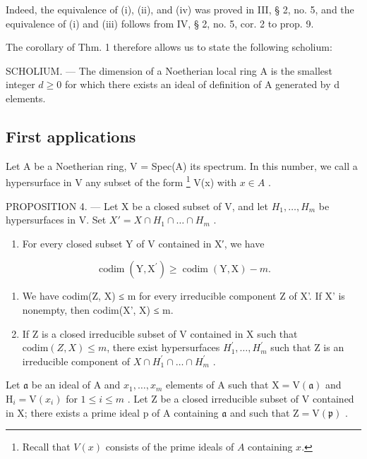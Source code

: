 Indeed, the equivalence of (i), (ii), and (iv) was proved in III, § 2, no. 5, and the equivalence of (i) and (iii) follows from IV, § 2, no. 5, cor. 2 to prop. 9.

The corollary of Thm. 1 therefore allows us to state the following scholium:

SCHOLIUM. --- The dimension of a Noetherian local ring A is the smallest integer \(d \geqslant 0\) for which there exists an ideal of definition of A generated by d elements.

\subsection{First applications}

Let A be a Noetherian ring, V = Spec(A) its spectrum. In this number, we call a hypersurface in V any subset of the form \footnote{Recall that \(V(x)\) consists of the prime ideals of \(A\) containing \(x\).} V(x) with \(x \in A\) .

PROPOSITION 4. --- Let X be a closed subset of V, and let \(H_{1}, \ldots, H_{m}\) be hypersurfaces in V. Set \(X' = X \cap H_{1} \cap \ldots \cap H_{m}\) .

\begin{enumerate}
\def\labelenumi{\alph{enumi})}
\tightlist
\item
  For every closed subset Y of V contained in X′, we have
\end{enumerate}

\[
\operatorname{codim} (\mathrm{Y}, \mathrm{X} ^ {\prime}) \geqslant \operatorname{codim} (\mathrm{Y}, \mathrm{X}) - m.
\]

\begin{enumerate}
\def\labelenumi{\alph{enumi})}
\setcounter{enumi}{1}
\item
  We have codim(Z, X) ≤ m for every irreducible component Z of X'. If X' is nonempty, then codim(X', X) ≤ m.
\item
  If Z is a closed irreducible subset of V contained in X such that \(\text{codim}(Z, X) \leqslant m\), there exist hypersurfaces \(H_{1}^{\prime}, \ldots, H_{m}^{\prime}\) such that Z is an irreducible component of \(X \cap H_{1}^{\prime} \cap \ldots \cap H_{m}^{\prime}\) .
\end{enumerate}

Let \(\mathfrak{a}\) be an ideal of A and \(x_{1},\ldots,x_{m}\) elements of A such that \(\mathrm{X}=\mathrm{V}(\mathfrak{a})\) and \(\mathrm{H}_{i}=\mathrm{V}(x_{i})\) for \(1\leqslant i\leqslant m\) . Let Z be a closed irreducible subset of V contained in X; there exists a prime ideal p of A containing \(\mathfrak{a}\) and such that \(\mathrm{Z}=\mathrm{V}(\mathfrak{p})\) .

